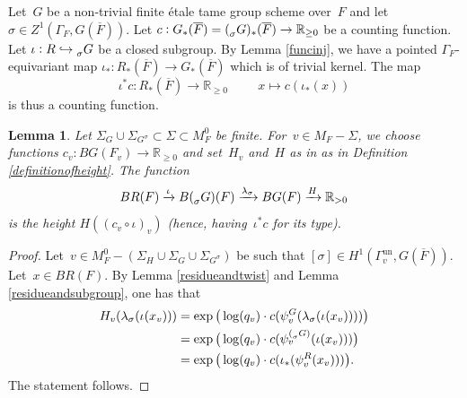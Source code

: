 \documentclass[a4paper,english,12pt]{amsart}
\newcommand{\RR}{\mathbb{R}}
\newcommand{\oF}{\overline F}
\newcommand{\sG}{\prescript{}{\sigma}G}
\DeclareMathOperator{\un}{un}
\newtheorem{lem}[equation]{Lemma}
\numberwithin{equation}{subsection}
\begin{document}
\subsubsection{}\label{pullbackcountfunc} Let~$G$ be a non-trivial finite \' etale tame group scheme over~$F$ and let~$\sigma\in Z^1(\Gamma_F, G(\oF))$. Let $c:G_*(\oF)=(\sG)_*(\oF)\to\RR_{\geq 0}$ be a counting function. %
Let $\iota:R\hookrightarrow \sG$ be a closed subgroup. By Lemma \ref{funcinj}, we have a pointed $\Gamma_F$-equivariant map $\iota_{*}:R_*(\oF)\to G_*(\oF)$ which is of trivial kernel. The map $$\iota^*c:R_*(\oF)\to\RR_{\geq 0}\hspace{1cm}x\mapsto c(\iota_*(x))$$ is thus a counting function.
\begin{lem}\label{composingheights} Let $\Sigma_G\cup\Sigma_{G^{\sigma}}\subset \Sigma\subset M_F^0$ be finite. For~$v\in M_F-\Sigma$, we choose functions $c_v:BG(F_v)\to\RR_{\geq 0}$ and set~$H_v$ and~$H$ as in  as in Definition \ref{definitionofheight}. The function $$BR(F)\xrightarrow{\iota} B(\sG)(F)\xrightarrow{\lambda_{\sigma}} BG(F)\xrightarrow{H}\RR_{>0}$$is the height $H((c_v\circ\iota)_v)$ (hence, having~$\iota^*c$ for its type).
\end{lem}
\begin{proof}
Let~$v\in M_F^0-(\Sigma_H\cup\Sigma_G\cup\Sigma_{G^{\sigma}})$ be such that $[\sigma]\in H^1(\Gamma_v^{\un}, G(\oF))$. Let~$x\in BR(F)$. By Lemma \ref{residueandtwist} and Lemma \ref{residueandsubgroup}, one has that \begin{align*}
H_v(\lambda_\sigma(\iota(x_v)))&=\exp\big(\log(q_v)\cdot {c(\psi^G_v(\lambda_{\sigma}(\iota(x_v))))}\big)\\&=\exp\big(\log(q_v)\cdot {c(\psi_v^{(\sG)}(\iota(x_v)))}\big)\\&=\exp\big(\log(q_v)\cdot c(\iota_*(\psi^R_v(x_v)))\big).
\end{align*}
The statement follows.
\end{proof}
\end{document}
